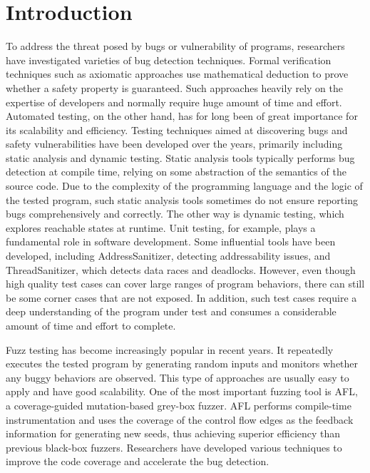 \chapter{\label{cha:intro}Introduction}


To address the threat posed by bugs or vulnerability of programs, researchers have investigated varieties of bug detection techniques. Formal verification techniques such as axiomatic approaches use mathematical deduction to prove whether a safety property is guaranteed. Such approaches heavily rely on the expertise of developers and normally require huge amount of time and effort. %
Automated testing, on the other hand, has for long been of great importance for its scalability and efficiency. Testing techniques aimed at discovering bugs and safety vulnerabilities have been developed over the years, primarily including static analysis and dynamic testing. Static analysis tools typically performs bug detection at compile time, relying on some abstraction of the semantics of the source code. %
Due to the complexity of the programming language and the logic of the tested program, such static analysis tools sometimes do not ensure reporting bugs comprehensively and correctly. The other way is dynamic testing, which explores reachable states at runtime. Unit testing, for example, plays a fundamental role in software development. Some influential tools have been developed, including AddressSanitizer, detecting addressability issues, and ThreadSanitizer, which detects data races and deadlocks. However, even though high quality test cases can cover large ranges of program behaviors, there can still be some corner cases that are not exposed. In addition, such test cases require a deep understanding of the program under test and consumes a considerable amount of time and effort to complete. 


Fuzz testing has become increasingly popular in recent years. It repeatedly executes the tested program by generating random inputs and monitors whether any buggy behaviors are observed. This type of approaches are usually easy to apply and have good scalability. One of the most important fuzzing tool is AFL, a coverage-guided mutation-based grey-box fuzzer. AFL performs compile-time instrumentation and uses the coverage of the control flow edges as the feedback information for generating new seeds, thus achieving superior efficiency than previous black-box fuzzers. Researchers have developed various techniques to improve the code coverage and accelerate the bug detection. %

